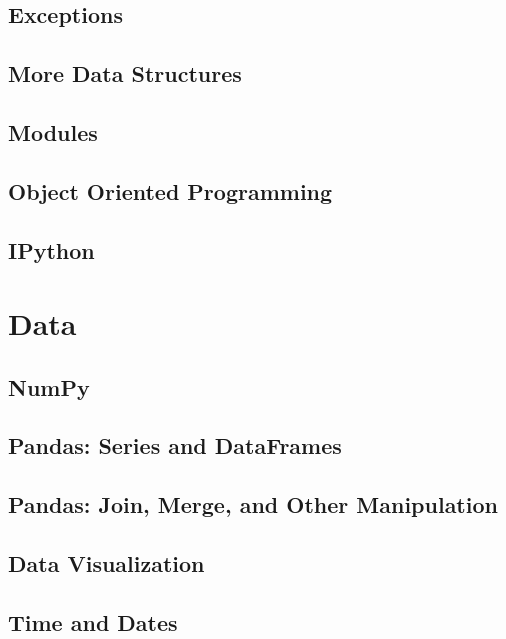 \documentclass{book} %
\begin{document}
\chapter{Exceptions}\label{chapter:except}


\chapter{More Data Structures}




\chapter{Modules}


\chapter{Object Oriented Programming}


\chapter{IPython}



\part{Data}%

\chapter{NumPy}


\chapter{Pandas: Series and DataFrames}


\chapter{Pandas: Join, Merge, and Other Manipulation}


\chapter{Data Visualization}


\chapter{Time and Dates}

\end{document}
